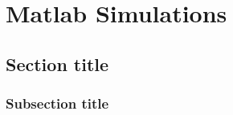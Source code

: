 \documentclass[a4paper,11pt,oneside]{book}
\begin{document}
			
			
			
			\chapter{Matlab Simulations}
			
			\section{Section title}
			\subsection {Subsection title}
			
			
			
			
			
			
			
			{}
			
			
			
\end{document}
